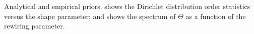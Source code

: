 \documentclass[xcolor=dvipsnames]{beamer}
\begin{document}
\begin{frame}
\begin{figure}[h]
    \centering
\end{figure}
\setcounter{subfigure}{0}
\vspace{-1em}
Analytical and empirical priors.
 shows the Dirichlet distribution order statistics versus the shape parameter; and
 shows the spectrum of $\Theta$ as a function of the 
rewiring parameter.
\end{frame}
\end{document}
